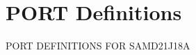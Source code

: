 \hypertarget{group___s_a_m_d21_j18_a__port}{}\section{P\+O\+RT Definitions}
\label{group___s_a_m_d21_j18_a__port}
P\+O\+RT D\+E\+F\+I\+N\+I\+T\+I\+O\+NS F\+OR S\+A\+M\+D21\+J18A 